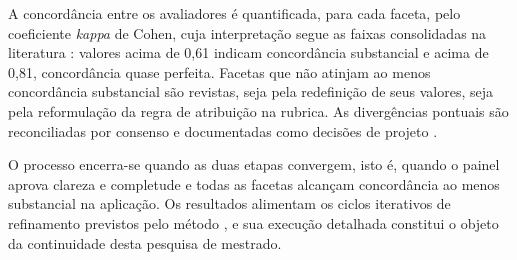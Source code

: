 A concordância entre os avaliadores é quantificada, para cada faceta, pelo coeficiente \textit{kappa} de Cohen, cuja interpretação segue as faixas consolidadas na literatura \citep{landis1977measurement, altman1991}: valores acima de 0,61 indicam concordância substancial e acima de 0,81, concordância quase perfeita. Facetas que não atinjam ao menos concordância substancial são revistas, seja pela redefinição de seus valores, seja pela reformulação da regra de atribuição na rubrica. As divergências pontuais são reconciliadas por consenso e documentadas como decisões de projeto \citep{szopinski2019}.

O processo encerra-se quando as duas etapas convergem, isto é, quando o painel aprova clareza e completude e todas as facetas alcançam concordância ao menos substancial na aplicação. Os resultados alimentam os ciclos iterativos de refinamento previstos pelo método \citep{nickerson2013method}, e sua execução detalhada constitui o objeto da continuidade desta pesquisa de mestrado.